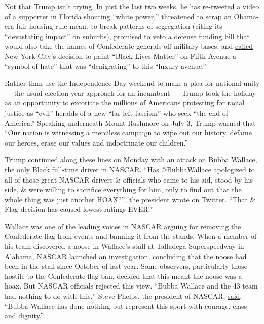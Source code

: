 Not that Trump isn't trying. In just the last two weeks, he has
\href{https://www.latimes.com/world-nation/story/2020-06-28/trump-tweets-video-with-white-power-chant-then-deletes-it}{re-tweeted}
a video of a supporter in Florida shouting ``white power,''
\href{https://www.politico.com/news/2020/07/01/trump-hud-fair-housing-rule-346996}{threatened}
to scrap an Obama-era fair housing rule meant to break patterns of
segregation (citing its ``devastating impact'' on suburbs), promised to
\href{https://www.npr.org/2020/07/01/885944809/trump-vows-to-veto-defense-bill-if-it-removes-confederate-names-from-military-ba}{veto}
a defense funding bill that would also take the names of Confederate
generals off military bases, and
\href{https://twitter.com/realdonaldtrump/status/1278324680311681024?s=21}{called}
New York City's decision to paint ``Black Lives Matter'' on Fifth Avenue
a ``symbol of hate'' that was ``denigrating'' to this ``luxury avenue.''

Rather than use the Independence Day weekend to make a plea for national
unity --- the usual election-year approach for an incumbent --- Trump
took the holiday as an opportunity to
\href{https://www.whitehouse.gov/briefings-statements/remarks-president-trump-south-dakotas-2020-mount-rushmore-fireworks-celebration-keystone-south-dakota/}{excoriate}
the millions of Americans protesting for racial justice as ``evil''
heralds of a new ``far-left fascism'' who seek ``the end of America.''
Speaking underneath Mount Rushmore on July 3, Trump warned that ``Our
nation is witnessing a merciless campaign to wipe out our history,
defame our heroes, erase our values and indoctrinate our children.''

Trump continued along these lines on Monday with an attack on Bubba
Wallace, the only Black full-time driver in NASCAR. ``Has @BubbaWallace
apologized to all of those great NASCAR drivers \& officials who came to
his aid, stood by his side, \& were willing to sacrifice everything for
him, only to find out that the whole thing was just another HOAX?'', the
president
\href{https://twitter.com/realdonaldtrump/status/1280117571874951170?s=21}{wrote
on Twitter}. ``That \& Flag decision has caused lowest ratings EVER!''

Wallace was one of the leading voices in NASCAR arguing for removing the
Confederate flag from events and banning it from the stands. When a
member of his team discovered a noose in Wallace's stall at Talladega
Superspeedway in Alabama, NASCAR launched an investigation, concluding
that the noose had been in the stall since October of last year. Some
observers, particularly those hostile to the Confederate flag ban,
decided that this meant the noose was a hoax. But NASCAR officials
rejected this view. ``Bubba Wallace and the 43 team had nothing to do
with this,'' Steve Phelps, the president of NASCAR,
\href{https://ftw.usatoday.com/2020/06/nascar-bubba-wallace-noose-talladega-investigation-steve-phelps}{said}.
``Bubba Wallace has done nothing but represent this sport with courage,
class and dignity.''

